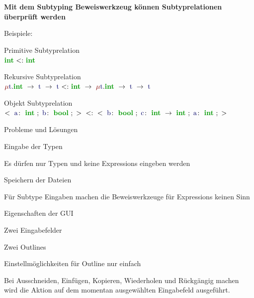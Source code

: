 
{

  \textbf{Mit dem Subtyping Beweiswerkzeug können Subtyprelationen überprüft werden} \\[6mm]
  \begin{itemgroup}{Beispiele:}
    \item Primitive Subtyprelation \\  $\TypeSubType {\TypeIntegerType} {\TypeIntegerType} $
    \item Rekursive Subtyprelation \\  $\TypeSubType{ \TypeRecType{\TypeTypeName{t} } {\TypeArrowType
       {\TypeIntegerType }{\TypeArrowType{\TypeTypeName{t}}{\TypeTypeName{t}}}}}
       {\TypeArrowType{\TypeIntegerType}{\TypeRecType{\TypeTypeName{t}}{\TypeArrowType
       {\TypeIntegerType}{\TypeArrowType{\TypeTypeName{t}}{\TypeTypeName{t}}}}}} $
    \item Objekt Subtyprelation \\     $\TypeSubType{\TypeObjectType{\TypeRowType{{\ExprIdentifier{a}}
       \colon\ {\TypeIntegerType}\ ;\ {\ExprIdentifier{b}}\colon\  \TypeBooleanType}\ ;}} 
       {\TypeObjectType{\TypeRowType{{\ExprIdentifier{b}}\colon\ {\TypeBooleanType}\ ;\ {\ExprIdentifier{c}}
       \colon\ {\TypeArrowType{\TypeIntegerType}{\TypeIntegerType}}\ ;\ {\ExprIdentifier{a}}\colon\ {\TypeIntegerType}
       \ ;}}}$
    \end{itemgroup}
}
{
  \begin{itemgroup}{Probleme und Lösungen}
    \item Eingabe der Typen
    \item Es dürfen nur Typen und keine Expressions eingeben werden
    \item Speichern der Dateien
    \item Für Subtype Eingaben machen die Beweiswerkzeuge für Expressions keinen Sinn
    \end{itemgroup}
}

{
  \begin{itemgroup}{Eigenschaften der GUI}
    \item Zwei Eingabefelder
    \item Zwei Outlines
    \item Einstellmöglichkeiten für Outline nur einfach
    \item Bei Ausschneiden, Einfügen, Kopieren, Wiederholen und Rückgängig machen wird die Aktion auf dem momentan
    ausgewählten Eingabefeld ausgeführt.
    \end{itemgroup}
}

